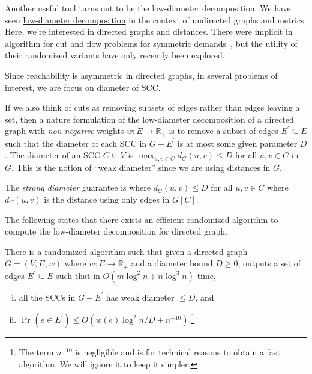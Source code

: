 Another useful tool turns out to be the low-diameter decomposition. We have seen \hyperref[def:low-diameter-decomposition]{low-diameter decomposition} in the context of undirected graphs and metrics. Here, we're interested in directed graphs and distances. There were implicit in algorithm for cut and flow problems for symmetric demands~\cite{klein1997approximation,seymour1995packing,even2000divide}, but the utility of their randomized variants have only recently been explored.

\begin{intuition}
	Since reachability is asymmetric in directed graphs, in several problems of interest, we are focus on diameter of SCC.
\end{intuition}

If we also think of cuts as removing subsets of edges rather than edges leaving a set, then a nature formulation of the low-diameter decomposition of a directed graph with \emph{non-negative} weights \(w\colon E \to \mathbb{R} _+\) is to remove a subset of edges \(E^{\prime} \subseteq E\) such that the diameter of each SCC in \(G - E^{\prime} \) is at most some given parameter \(D\). The diameter of an SCC \(C \subseteq V\) is \(\max _{u, v \in C} d_G(u, v) \leq D\) for all \(u, v \in C\) in \(G\). This is the notion of ``weak diameter'' since we are using distances in \(G\).

\begin{notation}\label{not:strong-diameter}
	The \emph{strong diameter} guarantee is where \(d_C(u, v) \leq D\) for all \(u, v \in C\) where \(d_C(u, v)\) is the distance using only edges in \(G[C]\).
\end{notation}

The following states that there exists an efficient randomized algorithm to compute the low-diameter decomposition for directed graph.

\begin{theorem}\label{thm:directed-LDD}
	There is a randomized algorithm such that given a directed graph \(G = (V, E, w)\) where \(w \colon E \to \mathbb{R} _+\) and a diameter bound \(D \geq 0\), outputs a set of edges \(E^{\prime} \subseteq E\) such that in \(O(m \log ^2 n + n \log ^3 n)\) time,
	\begin{enumerate}[(i)]
		\item all the SCCs in \(G - E^{\prime} \) has weak diameter \(\leq D\), and
		\item \(\Pr_{}(e \in E^{\prime} ) \leq O(w(e) \log ^2 n / D + n^{-10})\).\footnote{The term \(n^{-10}\) is negligible and is for technical reasons to obtain a fast algorithm. We will ignore it to keep it simpler.}
	\end{enumerate}
\end{theorem}

